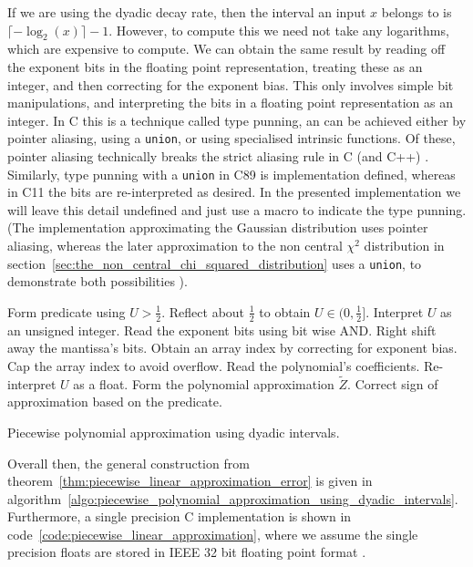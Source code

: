 \documentclass[manuscript,review]{acmart}
\begin{document}
If we are using the dyadic decay rate, then the interval an input $ x $  belongs to is $ \lceil -{\log}_2(x) \rceil - 1 $. However, to compute this we need not take any logarithms, which are expensive to compute. We can obtain the same result by reading off the exponent bits in the floating point representation, treating these as an integer, and then correcting for the exponent bias.  This only involves simple bit manipulations, and interpreting the bits in a floating point representation as an integer. In C this is a technique called type punning, an can be achieved either by pointer aliasing, using a \texttt{union}, or using specialised intrinsic functions. Of these, pointer aliasing technically breaks the strict aliasing rule in C (and C++) \citep[6.5.2.3]{iso2012c11} \citep[pages~163--164]{stallman2020gcc}. Similarly, type punning with a \texttt{union} in C89 is implementation defined, whereas in C11 the bits are re-interpreted as desired. In the presented implementation we will leave this detail undefined and just use a macro to indicate the type punning. (The implementation approximating the Gaussian distribution uses pointer aliasing, whereas the later approximation to the non central $ \chi^2 $ distribution in section~\ref{sec:the_non_central_chi_squared_distribution} uses a \texttt{union}, to demonstrate both possibilities \citep{sheridan2020approximate_random}).

\begin{algorithm}[h!tb]
\DontPrintSemicolon
{}
Form predicate using $ U > \tfrac{1}{2} $.\;
Reflect about $ \tfrac{1}{2} $ to obtain $ U \in (0, \tfrac{1}{2}] $.\;
Interpret $ U $ as an unsigned integer.\;
Read the exponent bits using bit wise AND.\;
Right shift away the mantissa's bits.\;
Obtain an array index by correcting for exponent bias.\;
Cap the array index to avoid overflow.\;
Read the polynomial's coefficients.\;
Re-interpret $ U $ as a float.\;
Form the polynomial approximation $ \tilde{Z} $.\;
Correct sign of approximation based on the predicate.\;
\caption{Piecewise polynomial approximation using dyadic intervals.}
\label{algo:piecewise_polynomial_approximation_using_dyadic_intervals}
\end{algorithm}

Overall then, the general construction from theorem~\ref{thm:piecewise_linear_approximation_error} is given in algorithm~\ref{algo:piecewise_polynomial_approximation_using_dyadic_intervals}. Furthermore, a single precision C implementation is shown in code~\ref{code:piecewise_linear_approximation}, where we assume the single precision floats are stored in IEEE 32 bit floating point format \citep{ieee2008ieee}. 
\end{document}
